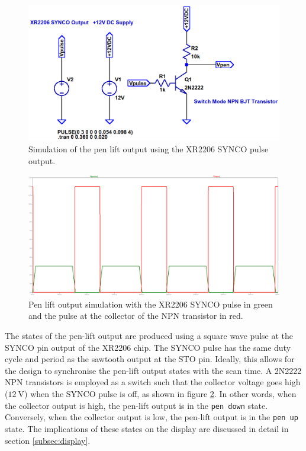 \documentclass[class=report,11pt,crop=false]{standalone}
\begin{document}
	\begin{figure}
		\centering
		\includegraphics[width=0.45\linewidth]{Figures/Methodology/emulator-pen-lift-ct-sim}
		\caption{Simulation of the pen lift output using the XR2206 SYNCO pulse output.}
		\label{fig:emulator-pen-lift-ct-sim}
	\end{figure}
	
	\begin{figure}
		\centering
		\includegraphics[width=0.7\linewidth]{Figures/Methodology/emulator-pen-lift-ct-sim-output}
		\caption{Pen lift output simulation with the XR2206 SYNCO pulse in green and the pulse at the collector of the NPN transistor in red.}
		\label{fig:emulator-pen-lift-ct-output}
	\end{figure}

	The states of the pen-lift output are produced using a square wave pulse at the SYNCO pin output of the XR2206 chip. The SYNCO pulse has the same duty cycle and period as the sawtooth output at the STO pin. Ideally, this allows for the design to synchronise the pen-lift output states with the scan time. A 2N2222 NPN transistors is employed as a switch such that the collector voltage goes high ($\SI{12}{\volt}$) when the SYNCO pulse is off, as shown in figure \ref{fig:emulator-pen-lift-ct-output}. In other words, when the collector output is high, the pen-lift output is in the \texttt{pen down} state. Conversely, when the collector output is low, the pen-lift output is in the \texttt{pen up} state. The implications of these states on the display are discussed in detail in section \ref{subsec:display}. 
	
\end{document}
